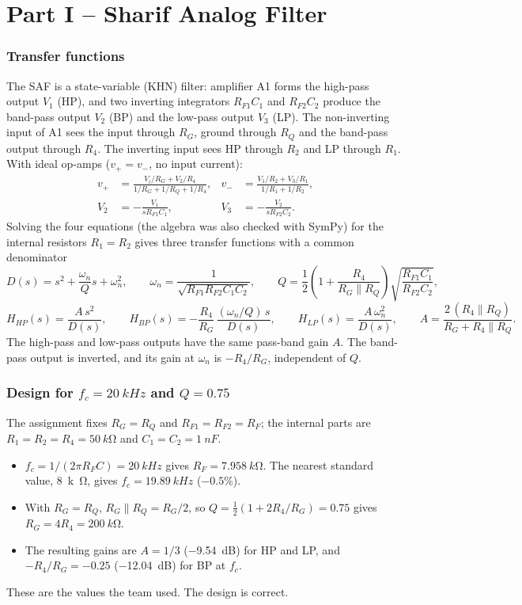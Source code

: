 \part*{Part I -- Sharif Analog Filter}
\section{Transfer functions}
The SAF is a state-variable (KHN) filter: amplifier A1 forms the high-pass output $V_1$ (HP), and two
inverting integrators $R_{F1}C_1$ and $R_{F2}C_2$ produce the band-pass output $V_2$ (BP) and the
low-pass output $V_3$ (LP). The non-inverting input of A1 sees the input through $R_G$, ground
through $R_Q$ and the band-pass output through $R_4$. The inverting input sees HP through $R_2$
and LP through $R_1$. With ideal op-amps ($v_+ = v_-$, no input current):
\begin{align*}
v_+ &= \frac{V_i/R_G + V_2/R_4}{1/R_G + 1/R_Q + 1/R_4}, &
v_- &= \frac{V_1/R_2 + V_3/R_1}{1/R_1 + 1/R_2},\\
V_2 &= -\frac{V_1}{s R_{F1} C_1}, &
V_3 &= -\frac{V_2}{s R_{F2} C_2}.
\end{align*}
Solving the four equations (the algebra was also checked with SymPy) for the internal resistors $R_1=R_2$ gives three transfer functions with a common denominator
\[
D(s) = s^2 + \frac{\omega_n}{Q}s + \omega_n^2,\qquad
\omega_n = \frac{1}{\sqrt{R_{F1}R_{F2}C_1C_2}},\qquad
Q = \frac{1}{2}\left(1 + \frac{R_4}{R_G \parallel R_Q}\right)\sqrt{\frac{R_{F1}C_1}{R_{F2}C_2}},
\]
\[
H_{HP}(s) = \frac{A\,s^2}{D(s)},\qquad
H_{BP}(s) = -\frac{R_4}{R_G}\,\frac{(\omega_n/Q)\,s}{D(s)},\qquad
H_{LP}(s) = \frac{A\,\omega_n^2}{D(s)},\qquad
A = \frac{2\,(R_4\parallel R_Q)}{R_G + R_4\parallel R_Q}.
\]
The high-pass and low-pass outputs have the same pass-band gain $A$. The band-pass output is inverted, and its gain at $\omega_n$ is $-R_4/R_G$, independent of $Q$.

\section{Design for $f_c = \SI{20}{kHz}$ and $Q = 0.75$}
The assignment fixes $R_G = R_Q$ and $R_{F1}=R_{F2}=R_F$; the internal parts are $R_1=R_2=R_4=\SI{50}{k\ohm}$ and $C_1=C_2=\SI{1}{nF}$.
\begin{itemize}
  \item $f_c = 1/(2\pi R_F C) = \SI{20}{kHz}$ gives $R_F = \SI{7.958}{k\ohm}$. The nearest standard value, \SI{8}{k\ohm}, gives $f_c = \SI{19.89}{kHz}$ ($-0.5\%$).
  \item With $R_G=R_Q$, $R_G\parallel R_Q = R_G/2$, so $Q = \tfrac12(1 + 2R_4/R_G) = 0.75$ gives $R_G = 4R_4 = \SI{200}{k\ohm}$.
  \item The resulting gains are $A = 1/3$ (\SI{-9.54}{dB}) for HP and LP, and $-R_4/R_G = -0.25$ (\SI{-12.04}{dB}) for BP at $f_c$.
\end{itemize}
These are the values the team used. The design is correct.

